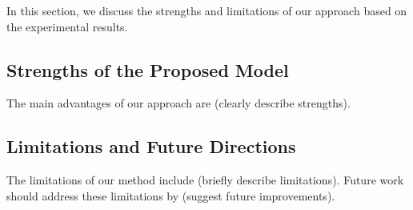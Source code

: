 In this section, we discuss the strengths and limitations of our approach based on the experimental results.

\subsection{Strengths of the Proposed Model}
The main advantages of our approach are (clearly describe strengths).

\subsection{Limitations and Future Directions}
The limitations of our method include (briefly describe limitations). Future work should address these limitations by (suggest future improvements).
